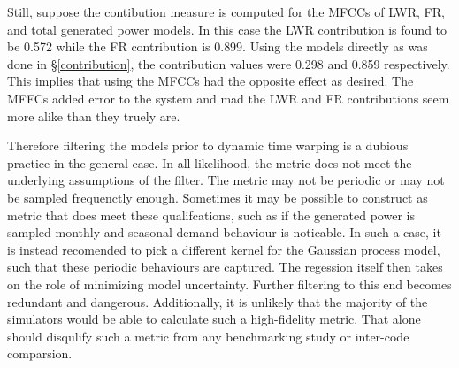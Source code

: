 Still, suppose the contibution measure is computed for the MFCCs of LWR, FR, and 
total generated power models.  In this case the LWR contribution is found to be 
0.572 while the FR contribution is 0.899. Using the models directly as was done 
in \S\ref{contribution}, the contribution values were 0.298 and 0.859 respectively.
This implies that using the MFCCs had the opposite effect as desired.  The MFFCs
added error to the system and mad the LWR and FR contributions seem more alike than 
they truely are.

Therefore filtering the models prior to dynamic time warping is a dubious practice
in the general case. In all likelihood, the metric does not meet the underlying 
assumptions of the filter. The metric may not be periodic or may not be sampled 
frequenctly enough. Sometimes it may be possible to construct as metric that does
meet these qualifcations, such as if the generated power is sampled monthly and 
seasonal demand behaviour is noticable. In such a case, it is instead recomended
to pick a different kernel for the Gaussian process model, such that these 
periodic behaviours are captured.  The regession itself then takes on the role of 
minimizing model uncertainty. Further filtering to this end becomes redundant and
dangerous.  Additionally, it is unlikely that 
the majority of the simulators would be able to calculate such a high-fidelity metric.
That alone should disqulify such a metric from any benchmarking study or
inter-code comparsion.
